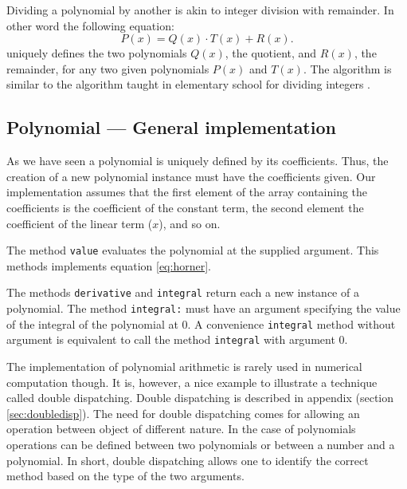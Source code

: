 \documentclass[twoside]{book}
\begin{document}
Dividing a polynomial by another is akin to integer division with
remainder. In other word the following equation:
\begin{equation}
P\left(x\right)=Q\left(x\right)\cdot
T\left(x\right)+R\left(x\right).
\end{equation}
uniquely defines the two polynomials $Q\left(x\right)$, the
quotient, and $R\left(x\right)$, the remainder, for any two given
polynomials $P\left(x\right)$ and $T\left(x\right)$. The algorithm
is similar to the algorithm taught in elementary school for
dividing integers \cite{Knuth2}.

\subsection{Polynomial --- General implementation}
As we have seen a polynomial is uniquely defined by its
coefficients. Thus, the creation of a new polynomial instance must
have the coefficients given. Our implementation assumes that the
first element of the array containing the coefficients is the
coefficient of the constant term, the second element the
coefficient of the linear term ($x$), and so on.

The method {\tt value} evaluates the polynomial at the supplied
argument. This methods implements equation \ref{eq:horner}.

The methods {\tt derivative} and {\tt integral} return each a new
instance of a polynomial. The method {\tt integral:} must have an
argument specifying the value of the integral of the polynomial at
0. A convenience {\tt integral} method without argument is
equivalent to call the method {\tt integral} with argument 0.

The implementation of polynomial arithmetic is rarely used in
numerical computation though. It is, however, a nice example to
illustrate a technique called double dispatching. Double
dispatching is described in appendix (\cf section
\ref{sec:doubledisp}). The need for double dispatching comes for
allowing an operation between object of different nature. In the
case of polynomials operations can be defined between two
polynomials or between a number and a polynomial. In short, double
dispatching allows one to identify the correct method based on the
type of the two arguments.
\end{document}
